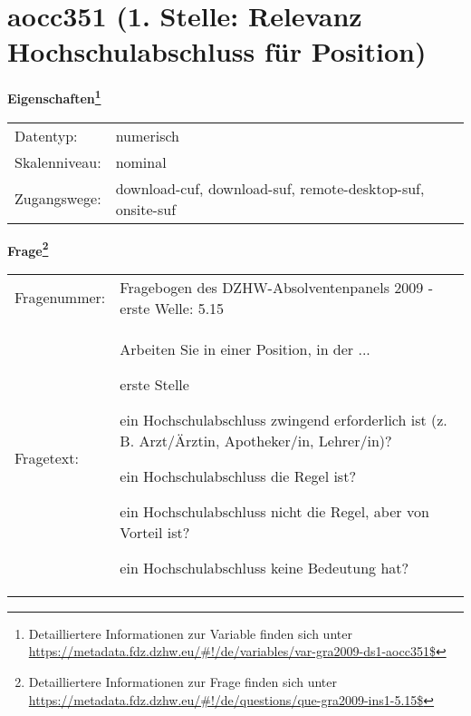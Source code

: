 
    \setcounter{footnote}{0}

    \vspace*{-1.8cm}
	\section{aocc351 (1. Stelle: Relevanz Hochschulabschluss für Position)}
	\label{section:aocc351}



    \vspace*{0.5cm}
    \noindent\textbf{Eigenschaften\footnote{Detailliertere Informationen zur Variable finden sich unter
		\url{https://metadata.fdz.dzhw.eu/\#!/de/variables/var-gra2009-ds1-aocc351$}}}\\
	\begin{tabularx}{\hsize}{@{}lX}
	Datentyp: & numerisch \\
	Skalenniveau: & nominal \\
	Zugangswege: &
	  download-cuf, 
	  download-suf, 
	  remote-desktop-suf, 
	  onsite-suf
 \\
    \end{tabularx}



				\vspace*{0.5cm}
                \noindent\textbf{Frage\footnote{Detailliertere Informationen zur Frage finden sich unter
		              \url{https://metadata.fdz.dzhw.eu/\#!/de/questions/que-gra2009-ins1-5.15$}}}\\
				\begin{tabularx}{\hsize}{@{}lX}
					Fragenummer: &
					  Fragebogen des DZHW-Absolventenpanels 2009 - erste Welle:
					  5.15
 \\
					Fragetext: & Arbeiten Sie in einer Position, in der ...\par  erste Stelle\par  ein Hochschulabschluss zwingend erforderlich ist (z. B. Arzt/Ärztin, Apotheker/in, Lehrer/in)?\par  ein Hochschulabschluss die Regel ist?\par  ein Hochschulabschluss nicht die Regel, aber von Vorteil ist?\par  ein Hochschulabschluss keine Bedeutung hat? \\
				\end{tabularx}





